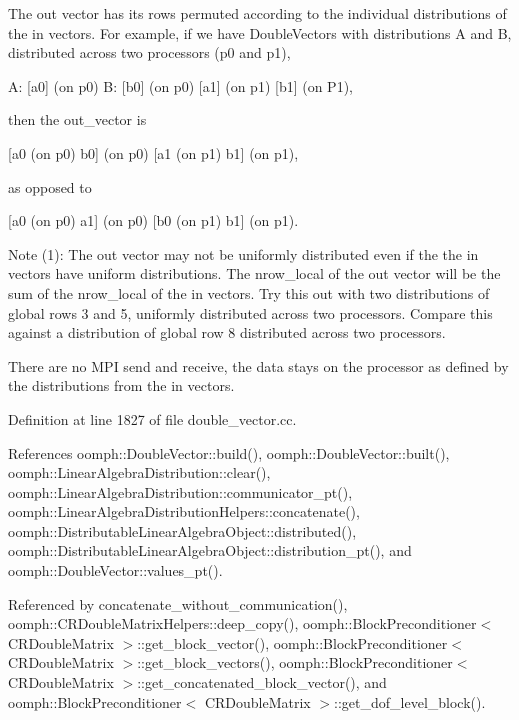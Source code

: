 The out vector has its rows permuted according to the individual distributions of the in vectors. For example, if we have Double\+Vectors with distributions A and B, distributed across two processors (p0 and p1),

A\+: \mbox{[}a0\mbox{]} (on p0) B\+: \mbox{[}b0\mbox{]} (on p0) \mbox{[}a1\mbox{]} (on p1) \mbox{[}b1\mbox{]} (on P1),

then the out\+\_\+vector is

\mbox{[}a0 (on p0) b0\mbox{]} (on p0) \mbox{[}a1 (on p1) b1\mbox{]} (on p1),

as opposed to

\mbox{[}a0 (on p0) a1\mbox{]} (on p0) \mbox{[}b0 (on p1) b1\mbox{]} (on p1).

Note (1)\+: The out vector may not be uniformly distributed even if the the in vectors have uniform distributions. The nrow\+\_\+local of the out vector will be the sum of the nrow\+\_\+local of the in vectors. Try this out with two distributions of global rows 3 and 5, uniformly distributed across two processors. Compare this against a distribution of global row 8 distributed across two processors.

There are no M\+PI send and receive, the data stays on the processor as defined by the distributions from the in vectors. 

Definition at line 1827 of file double\+\_\+vector.\+cc.



References oomph\+::\+Double\+Vector\+::build(), oomph\+::\+Double\+Vector\+::built(), oomph\+::\+Linear\+Algebra\+Distribution\+::clear(), oomph\+::\+Linear\+Algebra\+Distribution\+::communicator\+\_\+pt(), oomph\+::\+Linear\+Algebra\+Distribution\+Helpers\+::concatenate(), oomph\+::\+Distributable\+Linear\+Algebra\+Object\+::distributed(), oomph\+::\+Distributable\+Linear\+Algebra\+Object\+::distribution\+\_\+pt(), and oomph\+::\+Double\+Vector\+::values\+\_\+pt().



Referenced by concatenate\+\_\+without\+\_\+communication(), oomph\+::\+C\+R\+Double\+Matrix\+Helpers\+::deep\+\_\+copy(), oomph\+::\+Block\+Preconditioner$<$ C\+R\+Double\+Matrix $>$\+::get\+\_\+block\+\_\+vector(), oomph\+::\+Block\+Preconditioner$<$ C\+R\+Double\+Matrix $>$\+::get\+\_\+block\+\_\+vectors(), oomph\+::\+Block\+Preconditioner$<$ C\+R\+Double\+Matrix $>$\+::get\+\_\+concatenated\+\_\+block\+\_\+vector(), and oomph\+::\+Block\+Preconditioner$<$ C\+R\+Double\+Matrix $>$\+::get\+\_\+dof\+\_\+level\+\_\+block().

